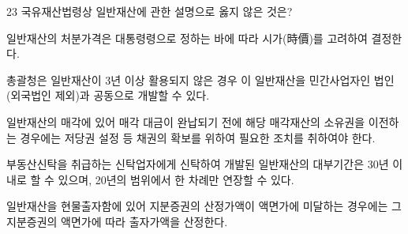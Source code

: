 \begin{question}{23}
국유재산법령상 일반재산에 관한 설명으로 옳지 않은 것은?
\begin{choices}
  \item 일반재산의 처분가격은 대통령령으로 정하는 바에 따라 시가(時價)를 고려하여 결정한다.
  \item 총괄청은 일반재산이 3년 이상 활용되지 않은 경우 이 일반재산을 민간사업자인 법인(외국법인 제외)과 공동으로 개발할 수 있다.
  \item 일반재산의 매각에 있어 매각 대금이 완납되기 전에 해당 매각재산의 소유권을 이전하는 경우에는 저당권 설정 등 채권의 확보를 위하여 필요한 조치를 취하여야 한다.
  \item 부동산신탁을 취급하는 신탁업자에게 신탁하여 개발된 일반재산의 대부기간은 30년 이내로 할 수 있으며, 20년의 범위에서 한 차례만 연장할 수 있다.
  \item 일반재산을 현물출자함에 있어 지분증권의 산정가액이 액면가에 미달하는 경우에는 그 지분증권의 액면가에 따라 출자가액을 산정한다.
\end{choices}
\end{question}
